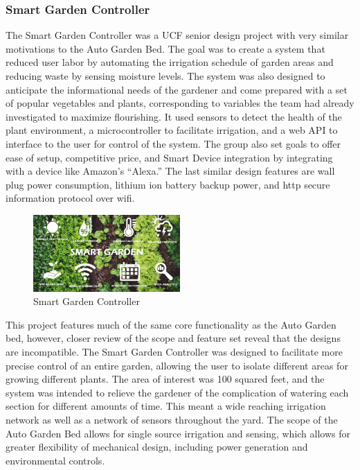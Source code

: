 \subsubsection{Smart Garden Controller}
The Smart Garden Controller was a UCF senior design project with very similar motivations to the Auto Garden Bed. The goal was to create a system that reduced user labor by automating the irrigation schedule of garden areas and reducing waste by sensing moisture levels\cite{smart-garden-controller}. The system was also designed to anticipate the informational needs of the gardener and come prepared with a set of popular vegetables and plants, corresponding to variables the team had already investigated to maximize flourishing. It used sensors to detect the health of the plant environment, a microcontroller to facilitate irrigation, and a web API to interface to the user for control of the system. The group also set goals to offer ease of setup, competitive price, and Smart Device integration by integrating with a device like Amazon’s “Alexa.” The last similar design features are wall plug power consumption, lithium ion battery backup power, and http secure information protocol over wifi.
\begin{figure}[H]
    \caption{Smart Garden Controller}
    \centering
    \includegraphics[width=0.5\textwidth]{images/3-1-3Pic.png}
\end{figure}
This project features much of the same core functionality as the Auto Garden bed, however, closer review of the scope and feature set reveal that the designs are incompatible. The Smart Garden Controller was designed to facilitate more precise control of an entire garden, allowing the user to isolate different areas for growing different plants. The area of interest was 100 squared feet, and the system was intended to relieve the gardener of the complication of watering each section for different amounts of time. This meant a wide reaching irrigation network as well as a network of sensors throughout the yard. The scope of the Auto Garden Bed allows for single source irrigation and sensing, which allows for greater flexibility of mechanical design, including power generation and environmental controls.

